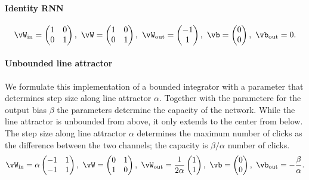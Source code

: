 \documentclass{article} %
\newcounter{ct}
\newcommand{\win}{\vW_{\text{in}}}
\newcommand{\wout}{\vW_{\text{out}}}
\newcommand{\bout}{\vb_{\text{out}}}
\theoremstyle{definition}
\theoremstyle{remark}
\begin{document}
\paragraph{Identity RNN}
\label{sec:ubpa,sec:iRNN}
\begin{equation}\label{eq:irnn}
\win = 
\begin{pmatrix}
1  &  0 \\
0 &  1
\end{pmatrix}, \
\vW = 
\begin{pmatrix}
1  &  0 \\
0  &  1
\end{pmatrix}, \
\wout = 
\begin{pmatrix}
-1  \\  1 
\end{pmatrix}, \
\vb = 
\begin{pmatrix}
0  \\ 0
\end{pmatrix}, \
\bout = 0.
\end{equation}


\paragraph{Unbounded line attractor}
We formulate this implementation of a bounded integrator with a parameter that determines step size along line attractor $\alpha$. Together with the parametere for the output bias $\beta$ the parameters determine the capacity of the network. While the line attractor is unbounded from above, it only extends to the center from below.  The step size along line attractor $\alpha$ determines the maximum number of clicks as the difference between the two channels; the capacity is $\beta/\alpha$ number of clicks.
\label{sec:ubla}
\begin{equation}\label{eq:ubla}
\win = \alpha
\begin{pmatrix}
-1  &  1 \\
-1  &  1
\end{pmatrix}, \
\vW = 
\begin{pmatrix}
0  &  1 \\
1  &  0
\end{pmatrix}, \
\wout = \frac{1}{2\alpha}
\begin{pmatrix}
1  \\  1 
\end{pmatrix}, \
\vb = 
\begin{pmatrix}
0  \\  0
\end{pmatrix}, \
\bout = -\frac{\beta}{\alpha}.
\end{equation}
\end{document}
